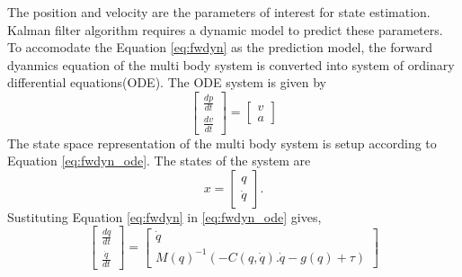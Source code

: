 The position and velocity are the parameters of interest for state estimation. Kalman filter algorithm requires a dynamic model to predict these parameters. To accomodate the Equation \ref{eq:fwdyn} as the prediction model, the forward dyanmics equation of the multi body system is converted into system of ordinary differential equations(ODE). The ODE system is given by
\begin{equation}
    \label{eq:fwdyn_ode}
    \begin{bmatrix} \frac{dp}{dt}  \\ \frac{dv}{dt} \end{bmatrix} = 
    \begin{bmatrix} v \\ a \end{bmatrix}
\end{equation}
 The state space representation of the multi body system is setup according to Equation \ref{eq:fwdyn_ode}. The states of the system are
\begin{equation}
    x = \begin{bmatrix} q \\ \dot q \end{bmatrix}.
\end{equation}
Sustituting Equation \ref{eq:fwdyn} in \ref{eq:fwdyn_ode} gives, 
\begin{equation}
    \label{eq:dyn_ss}
    \begin{bmatrix} \frac{dq}{dt} \\ \frac{\dot q}{dt} \end{bmatrix} =
    \begin{bmatrix}
    \dot q \\
    M(q)^{-1} \left( -C(q,\dot{q}).\dot{q} - g(q) + \tau \right )
    \end{bmatrix}
\end{equation}


